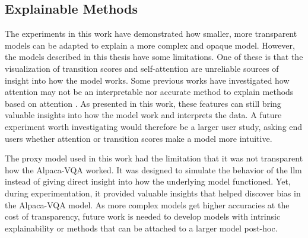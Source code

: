\subsection{Explainable Methods}

    The experiments in this work have demonstrated how smaller, more transparent models can be adapted to explain a more complex and opaque model. 
    However, the models described in this thesis have some limitations. 
    One of these is that the visualization of transition scores and self-attention are unreliable sources of insight into how the model works. 
    Some previous works have investigated how attention may not be an interpretable nor accurate method to explain methods based on attention \cite{serranoAttentionInterpretable2019, jainAttentionNotExplanation2019}. 
    As presented in this work, these features can still bring valuable insights into how the model work and interprets the data. 
    A future experiment worth investigating would therefore be a larger user study, asking end users whether attention or transition scores make a model more intuitive.
    
    The proxy model used in this work had the limitation that it was not transparent how the Alpaca-VQA worked. It was designed to simulate the behavior of the \gls{llm} instead of giving direct insight into how the underlying model functioned. Yet, during experimentation, it provided valuable insights that helped discover bias in the Alpaca-VQA model. 
    As more complex models get higher accuracies at the cost of transparency, future work is needed to develop models with intrinsic explainability or methods that can be attached to a larger model post-hoc.


